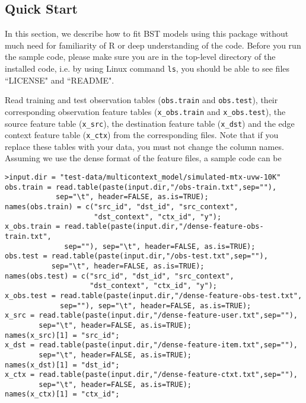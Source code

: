 
\subsection{Quick Start}
\label{sec:bst-quick-start}

In this section, we describe how to fit BST models using this package without much need for familiarity of R or deep understanding of the code. Before you run the sample code, please make sure you are in the top-level directory of the installed code, i.e. by using Linux command {\tt ls}, you should be able to see files ``LICENSE" and ``README".

Read training and test observation tables ({\tt obs.train} and {\tt obs.test}), their corresponding observation feature tables ({\tt x\_obs.train} and {\tt x\_obs.test}), the source feature table ({\tt x\_src}), the destination feature table ({\tt x\_dst}) and the edge context feature table ({\tt x\_ctx}) from the corresponding files.  Note that if you replace these tables with your data, you must not change the column names. Assuming we use the dense format of the feature files, a sample code can be
{\small\begin{verbatim}
>input.dir = "test-data/multicontext_model/simulated-mtx-uvw-10K"
obs.train = read.table(paste(input.dir,"/obs-train.txt",sep=""), 
            sep="\t", header=FALSE, as.is=TRUE);
names(obs.train) = c("src_id", "dst_id", "src_context", 
                     "dst_context", "ctx_id", "y");
x_obs.train = read.table(paste(input.dir,"/dense-feature-obs-train.txt",
              sep=""), sep="\t", header=FALSE, as.is=TRUE);
obs.test = read.table(paste(input.dir,"/obs-test.txt",sep=""), 
           sep="\t", header=FALSE, as.is=TRUE);
names(obs.test) = c("src_id", "dst_id", "src_context", 
                    "dst_context", "ctx_id", "y");
x_obs.test = read.table(paste(input.dir,"/dense-feature-obs-test.txt",
             sep=""), sep="\t", header=FALSE, as.is=TRUE);
x_src = read.table(paste(input.dir,"/dense-feature-user.txt",sep=""),
        sep="\t", header=FALSE, as.is=TRUE);
names(x_src)[1] = "src_id";
x_dst = read.table(paste(input.dir,"/dense-feature-item.txt",sep=""),
        sep="\t", header=FALSE, as.is=TRUE);
names(x_dst)[1] = "dst_id";
x_ctx = read.table(paste(input.dir,"/dense-feature-ctxt.txt",sep=""),
        sep="\t", header=FALSE, as.is=TRUE);
names(x_ctx)[1] = "ctx_id";
\end{verbatim}}

